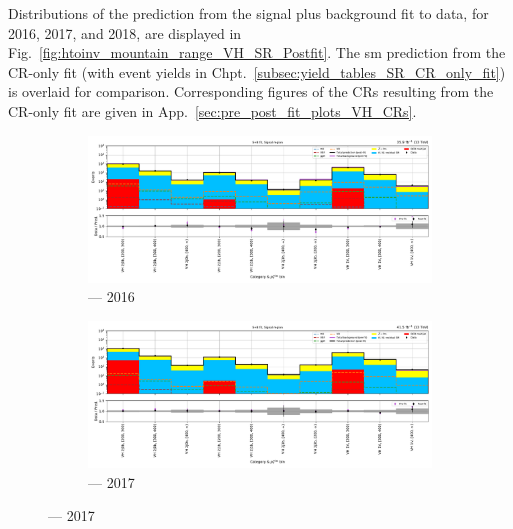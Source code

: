 Distributions of the prediction from the signal plus background fit to data, for 2016, 2017, and 2018, are displayed in Fig.~\ref{fig:htoinv_mountain_range_VH_SR_Postfit}. The \acrshort{sm} prediction from the \gls{CR}-only fit (with event yields in Chpt.~\ref{subsec:yield_tables_SR_CR_only_fit}) is overlaid for comparison. Corresponding figures of the \glspl{CR} resulting from the \gls{CR}-only fit are given in App.~\ref{sec:pre_post_fit_plots_VH_CRs}.

\begin{figure}[htbp]
    \centering
    \begin{subfigure}[b]{0.9\textwidth}
        \includegraphics[width=\textwidth]{figures/mountain_ranges/2016/VH/SR_tree_fit_s-abs_values_VH_cats.pdf}
        \caption{\VH --- 2016}
    \end{subfigure}

    \begin{subfigure}[b]{0.9\textwidth}
        \includegraphics[width=\textwidth]{figures/mountain_ranges/2017/VH/SR_tree_fit_s-abs_values_VH_cats.pdf}
        \caption{\VH --- 2017}
    \end{subfigure}


\end{figure}
